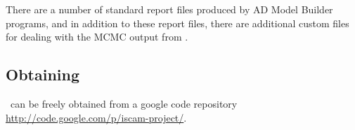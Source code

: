 \begin{multicols}{2}
 There are a number of standard report files produced by AD Model Builder programs, and in addition to these report files, there are additional custom files for dealing with the MCMC output from \iscam.


\subsection{Obtaining \iscam{}} %
\label{sub:obtaining_iscam}
\iscam\ can be freely obtained from a google code repository \url{http://code.google.com/p/iscam-project/}.  %




\end{multicols}










